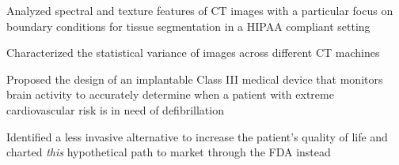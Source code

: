 \documentclass[letterpaper]{deedy-resume} %
\begin{document}
\begin{minipage}[t]{0.66\textwidth}

\sectionspace %



\begin{tightitemize}
\item Analyzed spectral and texture features of CT images with a particular focus on boundary 
conditions for tissue segmentation in a HIPAA compliant setting
\item Characterized the statistical variance of images across different CT machines 
\end{tightitemize}

\sectionspace 



\begin{tightitemize}
\item Proposed the design of an implantable Class III medical device that monitors brain activity to accurately determine when a patient with extreme cardiovascular risk is in need of defibrillation 
\item Identified a less invasive alternative to increase the patient's quality of life and charted \textit{this} hypothetical path to market through the FDA instead
\end{tightitemize}

\sectionspace 




\end{minipage}
\end{document}
